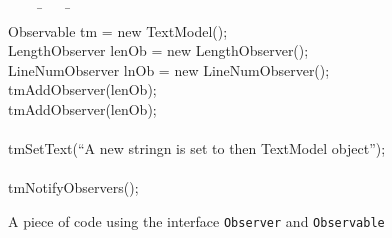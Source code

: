 \documentclass[fleqn]{llncs}
\begin{document}
\begin{figure}
\begin{center}
\begin{boxedminipage}{1\textwidth}
\scriptsize
\begin{tabbing}
\ \ \ \ \=\ \ \ \ \=\ \ \ \ \ \ \ \ \=\\
Observable tm = new TextModel();\\
LengthObserver lenOb = new LengthObserver();\\
LineNumObserver lnOb = new LineNumObserver();\\

tm{\fldacc}AddObserver(lenOb);\\
tm{\fldacc}AddObserver(lenOb);\\
\\
tm{\fldacc}SetText(``A new stringn is set to then TextModel object'');\\
\\
tm{\fldacc}NotifyObservers();\\



\end{tabbing}
\end{boxedminipage}
\end{center}
\caption{A piece of code using the interface \texttt{Observer} and \texttt{Observable}}\label{FIG-OBSERVER-CONTEXT}
\end{figure}
\end{document}
